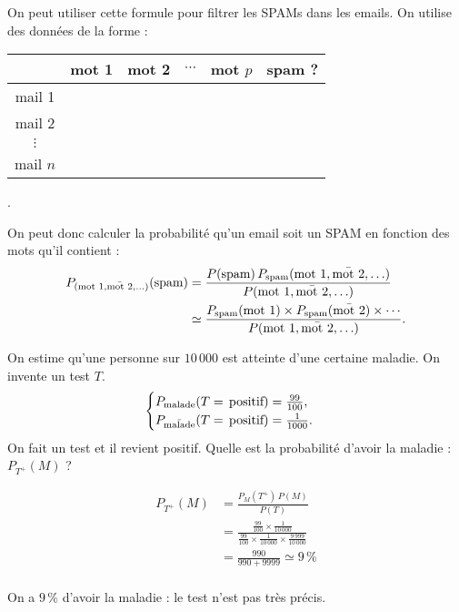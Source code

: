 \begin{exm}
	On peut utiliser cette formule pour filtrer les SPAMs dans les emails. On utilise des données de la forme : 
	\begin{center}
		\begin{tabular}{c|c|c|c|c|c}
			&mot 1&mot 2&$\cdots$&mot $p$&spam ?\\ \hline
			mail 1&&&&&\\ \hline
			mail 2&&&&&\\ \hline
			$\vdots$&&&&&\\ \hline
			mail $n$&&&&&
		\end{tabular}.
	\end{center}
	
	On peut donc calculer la probabilité qu'un email soit un SPAM en fonction des mots qu'il contient :
	\begin{align*}
		P_{(\text{mot 1},\overlin{\text{mot 2}}, \ldots)}(\text{spam}) &= \frac{P(\text{spam})\, P_{\text{spam}}(\text{mot 1}, \overlin{\text{mot 2}}, \ldots)}{P(\text{mot 1}, \overlin{\text{mot 2}}, \ldots)}\\
		&\simeq \frac{P_{\text{spam}}(\text{mot 1}) \times P_{\text{spam}}(\overlin{\text{mot 2}}) \times \cdots}{P(\text{mot 1}, \overlin{\text{mot 2}}, \ldots)}.
	\end{align*}
\end{exm}

\begin{exm}
	On estime qu'une personne sur $10\,000$ est atteinte d'une certaine maladie.
	On invente un test $T$. \[
		\begin{cases}
			P_{\text{malade}}(T = \,\text{positif}) = \frac{99}{100},\\
			P_{\overlin{\text{malade}}}(T = \,\text{positif}) = \frac{1}{1000}.\\
		\end{cases}
	\] On fait un test et il revient positif. Quelle est la probabilité d'avoir la maladie : $P_{T^+}(M)$ ?

	\begin{align*}
		P_{T^+}(M) &= \frac{P_M(T^+)\,P(M)}{P(T)}\\
		&= \frac{\frac{99}{100} \times \frac{1}{10\,000}}{\frac{99}{100}\times \frac{1}{10\,000} \times \frac{9\,999}{10\,000}} \\
		&= \frac{990}{990 + 9999} \simeq 9\,\% \\
	\end{align*}

	On a $9\,\%$ d'avoir la maladie : le test n'est pas très précis.
\end{exm}


